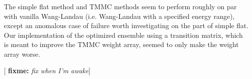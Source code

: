 \documentclass[11pt]{article}
\newcommand{\red}[1]{{\bf \color{red} #1}}
\newcommand{\fixme}[1]{[\red{fixme:} \emph{#1}]}
\begin{document}
The simple flat method and TMMC methods seem to perform roughly on par
with vanilla Wang-Landau (i.e. Wang-Landau with a specified energy
range), except an anomalous case of failure worth investigating on the
part of simple flat. Our implementation of the optimized ensemble
using a transition matrix, which is meant to improve the TMMC weight
array, seemed to only make the weight array worse.

\fixme{fix when I'm awake}


\nocite{*} 
\end{document}
